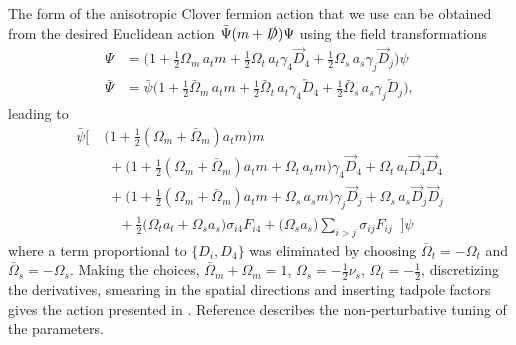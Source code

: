 \documentclass[twocolumn,amsmath,amssymb,prd,10pt,floatfix, 
superscriptaddress,nofootinbib, showpacs, preprintnumbers]{revtex4-1}
\begin{document}
The form of the anisotropic Clover fermion action that we use \cite{Lin:2008pr, Chen:2000ej} can be obtained from the desired Euclidean action $\bar{\Psi} ( m + \slashed{D} ) \Psi$ using the field transformations
\begin{align*}
	\Psi &= \big( 1 + \tfrac{1}{2} \Omega_m \, a_t m + \tfrac{1}{2} \Omega_t \, a_t \gamma_4 \overrightarrow{D}_{\!4} + \tfrac{1}{2} \Omega_s \, a_s \gamma_j \overrightarrow{D}_{\!j} \big)\psi \\
	\bar{\Psi} &= \bar{\psi} \big( 1 + \tfrac{1}{2} \bar{\Omega}_m \, a_t m + \tfrac{1}{2} \bar{\Omega}_t \, a_t \gamma_4 \overleftarrow{D}_{\!4} + \tfrac{1}{2} \bar{\Omega}_s \, a_s \gamma_j \overleftarrow{D}_{\!j} \big),
\end{align*}
leading to
\begin{align*}
	\bar{\psi} \Big[\;
		&\big( 1 + \tfrac{1}{2}(\Omega_m + \bar{\Omega}_m) a_t m \big) m \\
		&\;+ \big( 1 + \tfrac{1}{2}(\Omega_m + \bar{\Omega}_m) a_t m + \Omega_t \, a_t m \big) \gamma_4 \overrightarrow{D}_{\!4}  + \Omega_t \, a_t \overrightarrow{D}_{\!4}\overrightarrow{D}_{\!4} \\
		&\;+ \big( 1 + \tfrac{1}{2}(\Omega_m + \bar{\Omega}_m) a_t m + \Omega_s \, a_s m \big) \gamma_j \overrightarrow{D}_{\!j}  + \Omega_s \, a_s \overrightarrow{D}_{\!j}\overrightarrow{D}_{\!j} \\
		&\quad+ \tfrac{1}{2}\big( \Omega_t a_t + \Omega_s a_s \big) \sigma_{i4} F_{i4} + \big(\Omega_s a_s \big) \sum_{i>j} \sigma_{ij} F_{ij} \;\;
	 \Big]\psi
\end{align*}
where a term proportional to $\big\{ D_i, D_4 \big\}$ was eliminated by choosing $\bar{\Omega}_t = - \Omega_t$ and $\bar{\Omega}_s = - \Omega_s$. Making the choices, $\bar{\Omega}_m + \Omega_m = 1$, $\Omega_s = -\tfrac{1}{2} \nu_s$, $\Omega_t = -\tfrac{1}{2}$, discretizing the derivatives, smearing in the spatial directions and inserting tadpole factors gives the action presented in \cite{Edwards:2008ja, Lin:2008pr}. Reference \cite{Edwards:2008ja} describes the non-perturbative tuning of the parameters.
\end{document}
